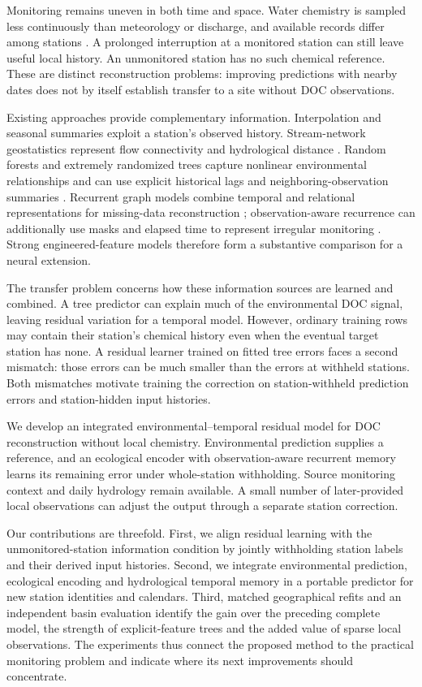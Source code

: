 \documentclass[11pt]{article}
\begin{document}
Monitoring remains uneven in both time and space. Water chemistry is sampled less continuously than meteorology or discharge, and available records differ among stations \citep{sterle2024}. A prolonged interruption at a monitored station can still leave useful local history. An unmonitored station has no such chemical reference. These are distinct reconstruction problems: improving predictions with nearby dates does not by itself establish transfer to a site without DOC observations.

Existing approaches provide complementary information. Interpolation and seasonal summaries exploit a station's observed history. Stream-network geostatistics represent flow connectivity and hydrological distance \citep{verhoef2006}. Random forests and extremely randomized trees capture nonlinear environmental relationships and can use explicit historical lags and neighboring-observation summaries \citep{breiman2001,geurts2006}. Recurrent graph models combine temporal and relational representations for missing-data reconstruction \citep{cini2022}; observation-aware recurrence can additionally use masks and elapsed time to represent irregular monitoring \citep{che2018}. Strong engineered-feature models therefore form a substantive comparison for a neural extension.

The transfer problem concerns how these information sources are learned and combined. A tree predictor can explain much of the environmental DOC signal, leaving residual variation for a temporal model. However, ordinary training rows may contain their station's chemical history even when the eventual target station has none. A residual learner trained on fitted tree errors faces a second mismatch: those errors can be much smaller than the errors at withheld stations. Both mismatches motivate training the correction on station-withheld prediction errors and station-hidden input histories.

We develop an integrated environmental--temporal residual model for DOC reconstruction without local chemistry. Environmental prediction supplies a reference, and an ecological encoder with observation-aware recurrent memory learns its remaining error under whole-station withholding. Source monitoring context and daily hydrology remain available. A small number of later-provided local observations can adjust the output through a separate station correction.

Our contributions are threefold. First, we align residual learning with the unmonitored-station information condition by jointly withholding station labels and their derived input histories. Second, we integrate environmental prediction, ecological encoding and hydrological temporal memory in a portable predictor for new station identities and calendars. Third, matched geographical refits and an independent basin evaluation identify the gain over the preceding complete model, the strength of explicit-feature trees and the added value of sparse local observations. The experiments thus connect the proposed method to the practical monitoring problem and indicate where its next improvements should concentrate.
\end{document}
